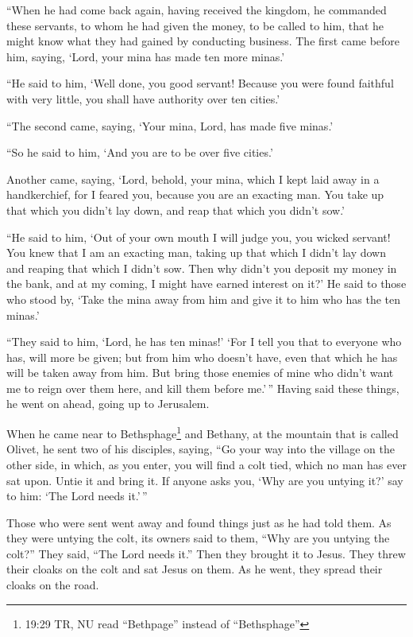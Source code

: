  ``When he had come back again, having received the
kingdom, he commanded these servants, to whom he had given the money, to
be called to him, that he might know what they had gained by conducting
business.  The first came before him, saying, `Lord, your
mina has made ten more minas.'

 ``He said to him, `Well done, you good servant! Because
you were found faithful with very little, you shall have authority over
ten cities.'

 ``The second came, saying, `Your mina, Lord, has made five
minas.'

 ``So he said to him, `And you are to be over five cities.'

 Another came, saying, `Lord, behold, your mina, which I
kept laid away in a handkerchief,  for I feared you,
because you are an exacting man. You take up that which you didn't lay
down, and reap that which you didn't sow.'

 ``He said to him, `Out of your own mouth I will judge you,
you wicked servant! You knew that I am an exacting man, taking up that
which I didn't lay down and reaping that which I didn't sow.
 Then why didn't you deposit my money in the bank, and at
my coming, I might have earned interest on it?'  He said to
those who stood by, `Take the mina away from him and give it to him who
has the ten minas.'

 ``They said to him, `Lord, he has ten minas!'
 `For I tell you that to everyone who has, will more be
given; but from him who doesn't have, even that which he has will be
taken away from him.  But bring those enemies of mine who
didn't want me to reign over them here, and kill them before me.'\,''
 Having said these things, he went on ahead, going up to
Jerusalem.

 When he came near to Bethsphage\footnote{19:29 TR, NU read
  ``Bethpage'' instead of ``Bethsphage''} and Bethany, at the mountain
that is called Olivet, he sent two of his disciples, 
saying, ``Go your way into the village on the other side, in which, as
you enter, you will find a colt tied, which no man has ever sat upon.
Untie it and bring it.  If anyone asks you, `Why are you
untying it?' say to him: `The Lord needs it.'\,''

 Those who were sent went away and found things just as he
had told them.  As they were untying the colt, its owners
said to them, ``Why are you untying the colt?''  They said,
``The Lord needs it.''  Then they brought it to Jesus. They
threw their cloaks on the colt and sat Jesus on them.  As
he went, they spread their cloaks on the road.


